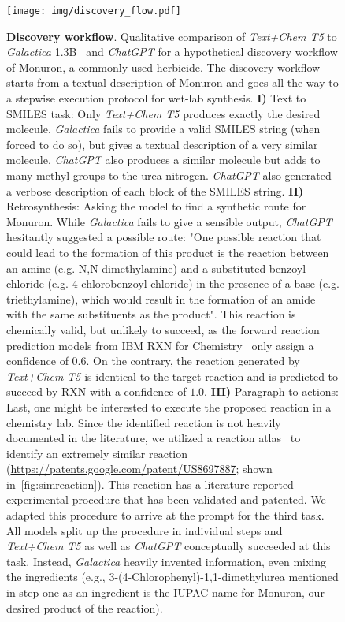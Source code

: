 \documentclass[nohyperref]{article}
\theoremstyle{plain}
\theoremstyle{definition}
\theoremstyle{remark}
\begin{document}
\begin{figure}[ht]
    \centering
\texttt{[image: img/discovery\_flow.pdf]}
\caption{\textbf{Discovery workflow}. 
Qualitative comparison of \emph{Text+Chem T5} to \textit{Galactica} 1.3B~\cite{taylor2022galactica} and \textit{ChatGPT} for a hypothetical discovery workflow of Monuron, a commonly used herbicide. The discovery workflow starts from a textual description of Monuron and goes all the way to a stepwise execution protocol for wet-lab synthesis. \newline
\textbf{I) }Text to SMILES task: Only \textit{Text+Chem T5} produces exactly the desired molecule. \textit{Galactica} fails to provide a valid SMILES string (when forced to do so), but gives a textual description of a very similar molecule. \textit{ChatGPT} also produces a similar molecule but adds to many methyl groups to the urea nitrogen. \textit{ChatGPT} also generated a verbose description of each block of the SMILES string. \newline
\textbf{II) }Retrosynthesis: Asking the model to find a synthetic route for Monuron. While \textit{Galactica} fails to give a sensible output, \textit{ChatGPT} hesitantly suggested a possible route: "One possible reaction that could lead to the formation of this product is the reaction between an amine (e.g. N,N-dimethylamine) and a substituted benzoyl chloride (e.g. 4-chlorobenzoyl chloride) in the presence of a base (e.g. triethylamine), which would result in the formation of an amide with the same substituents as the product". 
This reaction is chemically valid, but unlikely to succeed, as the forward reaction prediction models from IBM RXN for Chemistry~\cite{schwaller2019molecular} only assign a confidence of $0.6$. On the contrary, the reaction generated by \textit{Text+Chem T5} is identical to the target reaction and is predicted to succeed by RXN with a confidence of $1.0$.
\newline
\textbf{III)} Paragraph to actions: Last, one might be interested to execute the proposed reaction in a chemistry lab. Since the identified reaction is not heavily documented in the literature, we utilized a reaction atlas~\cite{schwaller2021mapping} to identify an extremely similar reaction (\url{https://patents.google.com/patent/US8697887}; shown in~\autoref{fig:simreaction}). This reaction has a literature-reported experimental procedure that has been validated and patented. We adapted this procedure to arrive at the prompt for the third task.
All models split up the procedure in individual steps and \textit{Text+Chem T5} as well as \textit{ChatGPT} conceptually succeeded at this task. Instead, \textit{Galactica} heavily invented information, even mixing the ingredients (e.g., 3-(4-Chlorophenyl)-1,1-dimethylurea mentioned in step one as an ingredient is the IUPAC name for Monuron, our desired product of the reaction).  
}
\end{figure}
\end{document}
